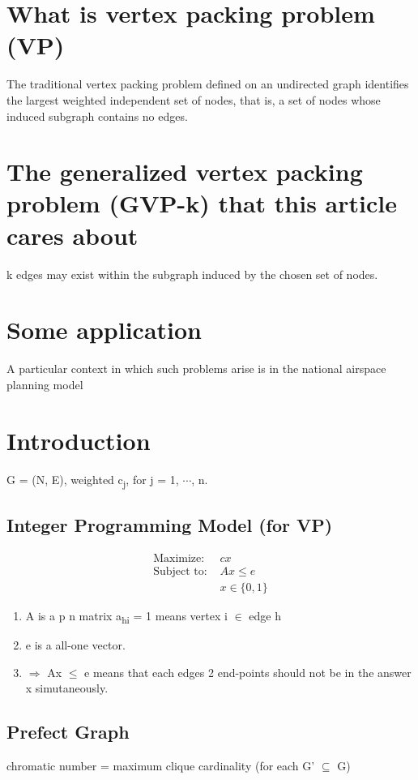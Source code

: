 \documentclass[11pt]{article}
\author{陈小羽}
\date{\today}
\title{}
\begin{document}
\tableofcontents

\section{What is vertex packing problem (VP)}
\label{sec:orge610274}
The traditional vertex packing problem deﬁned on an
undirected graph identiﬁes the largest weighted independent
set of nodes, that is, a set of nodes whose induced subgraph 
contains no edges.
\section{The generalized vertex packing problem (GVP-k) that this article cares about}
\label{sec:orgb6ab1a5}
k edges may exist within the subgraph induced by the chosen set of nodes.
\section{Some application}
\label{sec:orgf610b2e}
A particular context in which such problems arise is in the national 
airspace planning model
\section{Introduction}
\label{sec:org21c6bb3}
G = (N, E), weighted c\textsubscript{j}, for j = 1, \(\cdots{}\), n.
\subsection{Integer Programming Model (for VP)}
\label{sec:orgeb72cf9}
\begin{align*}
	\mbox{Maximize: } & cx \\
	\mbox{Subject to: } & Ax \leq e \\
				& x \in \{0, 1\}
\end{align*}
\begin{enumerate}
\item A is a p \texttimes{} n matrix a\textsubscript{hi} = 1 means vertex i \(\in\) edge h
\item e is a all-one vector.
\item \(\Rightarrow\) Ax \(\le\) e means that each edges 2 end-points should not
be in the answer x simutaneously.
\end{enumerate}
\subsection{Prefect Graph}
\label{sec:org0142686}
chromatic number = maximum clique cardinality (for each G' \(\subseteq\) G)
\end{document}
